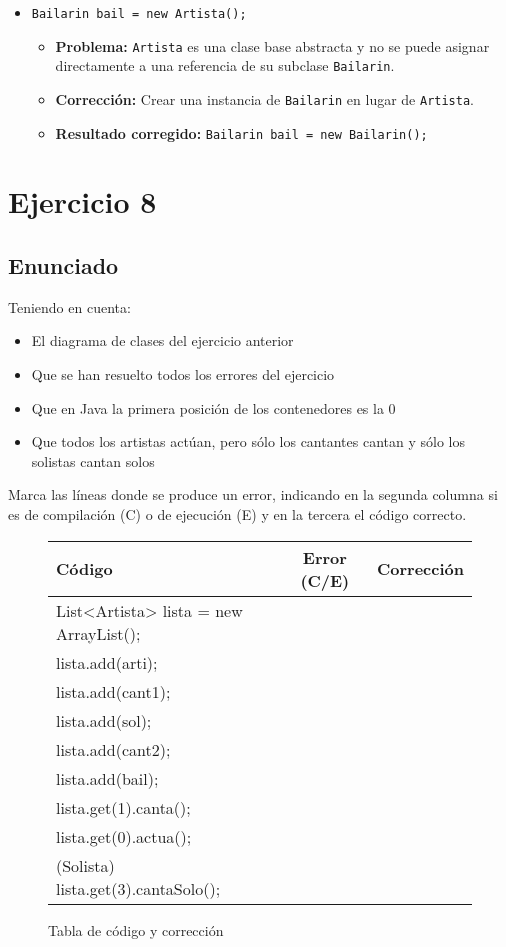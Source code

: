 \documentclass[a4paper,12pt]{article}
\begin{document}
\begin{itemize}
        \item \texttt{Bailarin bail = new Artista();}
            \begin{itemize}
                \item \textbf{Problema:} \texttt{Artista} es una clase base abstracta y no se puede asignar directamente a una referencia de su subclase \texttt{Bailarin}.
                \item \textbf{Corrección:} Crear una instancia de \texttt{Bailarin} en lugar de \texttt{Artista}.
                \item \textbf{Resultado corregido:} \texttt{Bailarin bail = new Bailarin();}
            \end{itemize}
    \end{itemize}

\section{Ejercicio 8}
    \subsection{Enunciado}

    Teniendo en cuenta:
    \begin{itemize}
        \item El diagrama de clases del ejercicio anterior
        \item Que se han resuelto todos los errores del ejercicio
        \item Que en Java la primera posición de los contenedores es la 0
        \item Que todos los artistas actúan, pero sólo los cantantes cantan y sólo los solistas cantan solos
    \end{itemize}

    Marca las líneas donde se produce un error, indicando en la segunda columna si es de compilación (C) o de ejecución (E) y en la tercera el código correcto.

    \begin{figure}[H]
        \centering
        \begin{tabular}{|l|c|l|}
        \hline
        \textbf{Código} & \textbf{Error (C/E)} & \textbf{Corrección} \\ \hline
        List<Artista> lista = new ArrayList(); & &  \\ \hline
        lista.add(arti); & &  \\ \hline
        lista.add(cant1); & &  \\ \hline
        lista.add(sol); & &  \\ \hline
        lista.add(cant2); & &  \\ \hline
        lista.add(bail); & &  \\ \hline
        lista.get(1).canta(); & &  \\ \hline
        lista.get(0).actua(); & &  \\ \hline
        (Solista) lista.get(3).cantaSolo(); & &  \\ \hline
        \end{tabular}
        \caption{Tabla de código y corrección}
    \end{figure}
\end{document}
